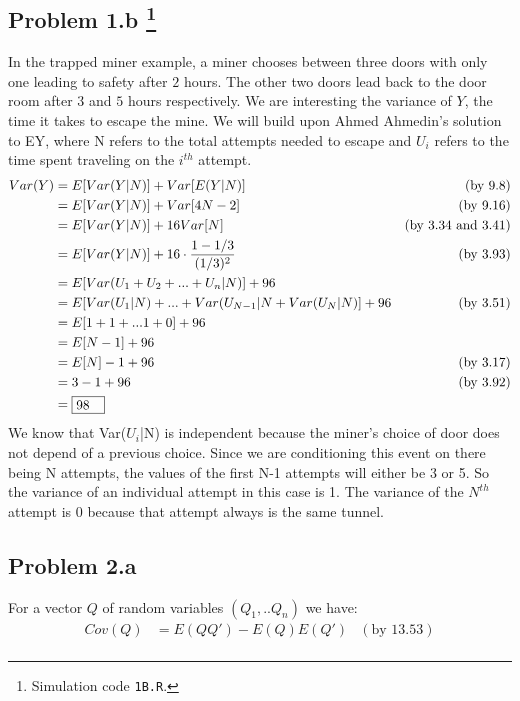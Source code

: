 \documentclass[letter]{article}
\newcounter{foot}
\begin{document}
\subsection*{Problem 1.b 
\footnote{Simulation code \texttt{1B.R}.}}
In the trapped miner example, a miner chooses between three doors with only one leading to safety after $2$ hours. The other two doors lead back to the door room after $3$ and $5$ hours respectively.\newline
\newline
We are interesting the variance of $Y$, the time it takes to escape the mine. We will build upon Ahmed Ahmedin's solution to EY, where N refers to the total attempts needed to escape and $U_{i}$ refers to the time spent traveling on the $i^{th}$ attempt. 
\begin{equation*}
	\begin{aligned}
	Var(Y)	&= E[Var(Y|N)] + Var[E(Y|N)]	&(\textrm{by 9.8})\\
			&= E[Var(Y|N)] + Var[4N-2]	&(\textrm{by 9.16})\\
			&= E[Var(Y|N)] + 16Var[N]	&(\textrm{by 3.34 and 3.41})\\
			&= E[Var(Y|N)] + 16\cdot\frac{1-1/3}{(1/3)^{2}}	&(\textrm{by 3.93})\\
			&= E[Var(U_{1} + U_{2} + ... + U_{n} |N)] + 96\\
			&= E[Var(U_{1}|N) + ... + Var(U_{N-1}|N + Var(U_{N}|N)] + 96 &(\textrm{by 3.51})\\
			&= E[ 1 + 1 + ... 1 + 0 ] + 96\\
			&= E[N-1] + 96\\
			&= E[N] - 1 + 96	&(\textrm{by 3.17})\\
			&= 3 - 1 + 96	&(\textrm{by 3.92})\\
			&= {\fbox {\parbox{0.25in}{98}}}\\
	\end{aligned}
\end{equation*}
We know that Var($U_{i}$|N) is independent because the miner's choice of door does not depend of a previous choice. Since we are conditioning this event on there being N attempts, the values of the first N-1 attempts will either be 3 or 5. So the variance of an individual attempt in this case is 1. The variance of the $N^{th}$ attempt is 0 because that attempt always is the same tunnel.

\subsection*{Problem 2.a}
For a vector $Q$ of random variables $(Q_1,..Q_n)$ we have:
\begin{equation*}
	\begin{aligned}
	Cov(Q)	&= E(QQ') - E(Q)E(Q') &(\textrm{by 13.53})\\
	\end{aligned}
\end{equation*}
\end{document}
